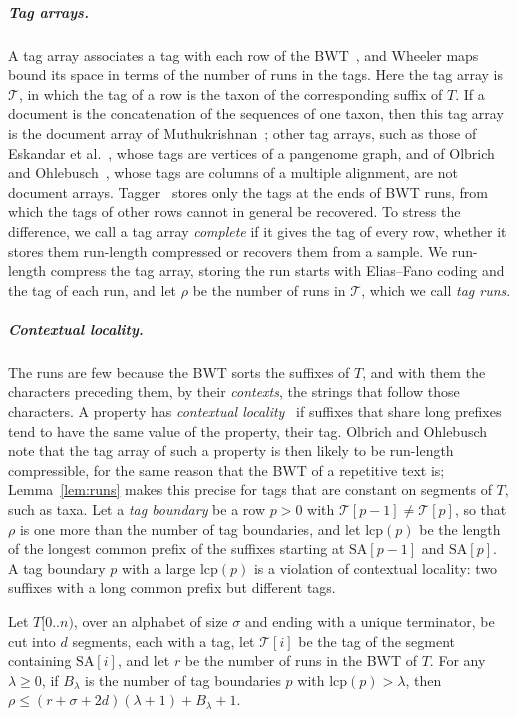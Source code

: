 \subparagraph*{Tag arrays.}
A tag array associates a tag with each row of the BWT~\cite{BalazEtAl2024,EskandarEtAl2025,ESP26,OO26}, and Wheeler maps~\cite{BalazEtAl2024} bound its space in terms of the number of runs in the tags.
Here the tag array is $\mathcal{T}$, in which the tag of a row is the taxon of the corresponding suffix of $T$.
If a document is the concatenation of the sequences of one taxon, then this tag array is the document array of Muthukrishnan~\cite{Mut02}; other tag arrays, such as those of Eskandar et al.~\cite{EskandarEtAl2025,ESP26}, whose tags are vertices of a pangenome graph, and of Olbrich and Ohlebusch~\cite{OO26}, whose tags are columns of a multiple alignment, are not document arrays.
Tagger~\cite{DAF+25} stores only the tags at the ends of BWT runs, from which the tags of other rows cannot in general be recovered.
To stress the difference, we call a tag array \emph{complete} if it gives the tag of every row, whether it stores them run-length compressed or recovers them from a sample.
We run-length compress the tag array, storing the run starts with Elias--Fano coding and the tag of each run, and let $\rho$ be the number of runs in $\mathcal{T}$, which we call \emph{tag runs}.

\subparagraph*{Contextual locality.}
The runs are few because the BWT sorts the suffixes of $T$, and with them the characters preceding them, by their \emph{contexts}, the strings that follow those characters.
A property has \emph{contextual locality}~\cite{Gagie2024tags,BalazEtAl2024,OO26} if suffixes that share long prefixes tend to have the same value of the property, their tag.
Olbrich and Ohlebusch~\cite{OO26} note that the tag array of such a property is then likely to be run-length compressible, for the same reason that the BWT of a repetitive text is; Lemma~\ref{lem:runs} makes this precise for tags that are constant on segments of $T$, such as taxa.
Let a \emph{tag boundary} be a row $p > 0$ with $\mathcal{T}[p - 1] \neq \mathcal{T}[p]$, so that $\rho$ is one more than the number of tag boundaries, and let $\mathrm{lcp}(p)$ be the length of the longest common prefix of the suffixes starting at $\mathrm{SA}[p - 1]$ and $\mathrm{SA}[p]$.
A tag boundary $p$ with a large $\mathrm{lcp}(p)$ is a violation of contextual locality: two suffixes with a long common prefix but different tags.

\begin{lemma}
\label{lem:runs}
Let $T[0..n)$, over an alphabet of size $\sigma$ and ending with a unique terminator, be cut into $d$ segments, each with a tag, let $\mathcal{T}[i]$ be the tag of the segment containing $\mathrm{SA}[i]$, and let $r$ be the number of runs in the BWT of $T$.
For any $\lambda \geq 0$, if $B_\lambda$ is the number of tag boundaries $p$ with $\mathrm{lcp}(p) > \lambda$, then $\rho \leq (r + \sigma + 2d)(\lambda + 1) + B_\lambda + 1$.
\end{lemma}

